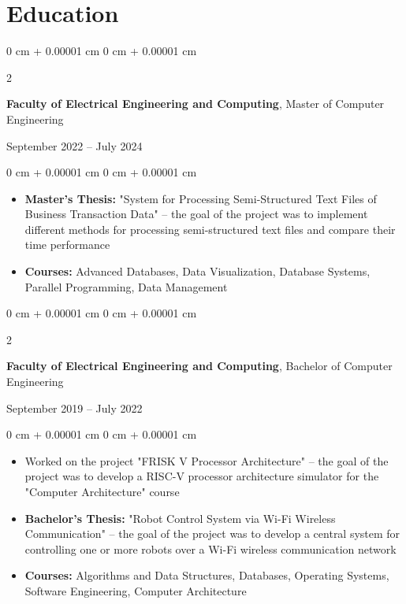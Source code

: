 \documentclass[10pt, letterpaper]{article}
\newenvironment{highlights}{
    \begin{itemize}[
        topsep=0.10 cm,
        parsep=0.10 cm,
        partopsep=0pt,
        itemsep=0pt,
        leftmargin=0 cm + 10pt
    ]
}{
    \end{itemize}
} %
\newenvironment{onecolentry}{
    \begin{adjustwidth}{
        0 cm + 0.00001 cm
    }{
        0 cm + 0.00001 cm
    }
}{
    \end{adjustwidth}
} %
\newenvironment{twocolentry}[2][]{
    \onecolentry
    \def\secondColumn{#2}
    \setcolumnwidth{\fill, 4.5 cm}
    \begin{paracol}{2}
}{
    \switchcolumn \raggedleft \secondColumn
    \end{paracol}
    \endonecolentry
} %
\begin{document}
    \section{Education}



        \begin{twocolentry}{
            September 2022 – July 2024
        }
            \textbf{Faculty of Electrical Engineering and Computing}, Master of Computer Engineering
        \end{twocolentry}
        
        \vspace{0.10 cm}
        \begin{onecolentry}
            \begin{highlights}
                \item \textbf{Master's Thesis:} "System for Processing Semi-Structured Text Files of Business Transaction Data" – the goal of the project was to implement different methods for processing semi-structured text files and compare their time performance
                \item \textbf{Courses:} Advanced Databases, Data Visualization, Database Systems, Parallel Programming, Data Management
            \end{highlights}
        \end{onecolentry}   


        \begin{twocolentry}{
            September 2019 – July 2022
            }
            \textbf{Faculty of Electrical Engineering and Computing}, Bachelor of Computer Engineering
        \end{twocolentry}
            
            \vspace{0.10 cm}
        \begin{onecolentry}
            \begin{highlights}
                \item Worked on the project "FRISK V Processor Architecture" – the goal of the project was to develop a RISC-V processor architecture simulator for the "Computer Architecture" course
                \item \textbf{Bachelor's Thesis:} "Robot Control System via Wi-Fi Wireless Communication" – the goal of the project was to develop a central system for controlling one or more robots over a Wi-Fi wireless communication network
                \item \textbf{Courses:} Algorithms and Data Structures, Databases, Operating Systems, Software Engineering, Computer Architecture
            \end{highlights}
        \end{onecolentry}
\end{document}

